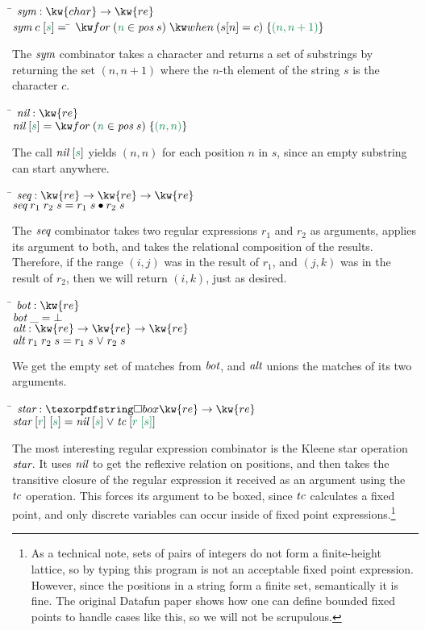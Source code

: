 \begin{tabbing}
\qquad \= $\name{sym} : \kw{char} \to \kw{re}$ \+\\
$\name{sym}\;c\;\ebox{s} =\; $\= $\efor{n}{\name{pos}\;s}{\ewhen{s[n] = c}{\eset{(n, n+1)}}}$ 
\end{tabbing}
The $\text{\itshape sym}$ combinator takes a character and returns a set of
substrings by returning the set $(n, n+1)$ where the $n$-th element of
the string $s$ is the character $c$.
%
\begin{tabbing}
\qquad \=   $\name{nil} : \kw{re}$ \+\\
  $\name{nil}\;\ebox{s} = \efor{n}{\name{pos}\;s}{\eset{(n,n)}}$
\end{tabbing}
%
The call $\name{nil}\;\ebox{s}$ yields $(n,n)$ for each position
$n$ in $s$, since an empty substring can start anywhere.
%
\begin{tabbing}
\qquad \=   $\name{seq} : \kw{re} \to \kw{re} \to \kw{re}$ \+\\
  $\text{\itshape seq}\;r_1\;r_2\;s = r_1\;s \bullet r_2\;s$
\end{tabbing}
% 
The $\text{\itshape seq}$ combinator takes two regular expressions $r_1$ and $r_2$
as arguments, applies its argument to both, and takes the relational
composition of the results. Therefore, if the range $(i,j)$ was in the
result of $r_1$, and $(j,k)$ was in the result of $r_2$, then
we will return $(i,k)$, just as desired. 
%
\begin{tabbing}
\qquad \=   $\name{bot} : \kw{re}$ \+\\
  $\text{\itshape bot}\;\_ = \bot$ \\[1em]

  $\name{alt} : \kw{re} \to \kw{re} \to \kw{re}$ \\
  $\name{alt}\;r_1\;r_2\;s = r_1\;s \vee r_2\;s$
\end{tabbing}
%
We get the empty set of matches from $\text{\itshape bot}$, and 
$\text{\itshape alt}$ unions the matches of its two arguments. 
%
\begin{tabbing}
\qquad \=   $\name{star} : \iso\kw{re} \to \kw{re}$ \+\\
  $\name{star}\;\ebox{r}\;\ebox{s} = \name{nil}\;\ebox{s} \vee \name{tc}\;\ebox{r\;\ebox{s}}$ 
\end{tabbing}
The most interesting regular expression combinator is the Kleene star
operation $\text{\itshape star}$.  It uses $\text{\itshape nil}$ to get the
reflexive relation on positions, and then takes the transitive closure
of the regular expression it received as an argument using the
$\text{\itshape tc}$ operation. This forces its argument to be boxed, since
$\text{\itshape tc}$ calculates a fixed point, and only discrete variables can
occur inside of fixed point expressions.\footnote{As a technical note,
  sets of pairs of integers do not form a finite-height lattice, so by
  typing this program is not an acceptable fixed point expression.
  However, since the positions in a string form a finite set,
  semantically it is fine. The original Datafun paper shows how one can 
  define bounded fixed points to handle cases like this, so we will not be
  scrupulous.}
  


